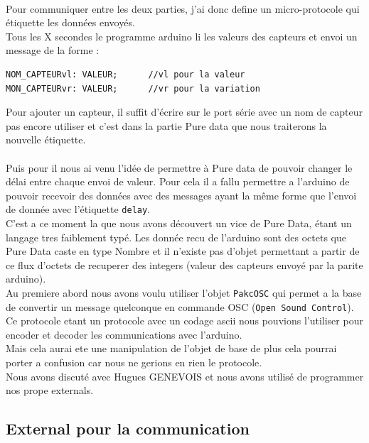 \documentclass[a4paper, titlepage, oneside, 12pt]{article}%
\begin{document}
\paragraph{}
Pour communiquer entre les deux parties, j'ai donc define un micro-protocole qui étiquette les données envoyés.\\
Tous les X secondes le programme arduino li les valeurs des capteurs et envoi un message de la forme :
\begin{lstlisting}
NOM_CAPTEURvl: VALEUR;		//vl pour la valeur
MON_CAPTEURvr: VALEUR;		//vr pour la variation
\end{lstlisting}

Pour ajouter un capteur, il suffit d'écrire sur le port série avec un nom de capteur pas encore utiliser et c'est dans la partie Pure data que nous traiterons la nouvelle étiquette.

\paragraph{}
Puis pour il nous ai venu l'idée de permettre à Pure data de pouvoir changer le délai entre chaque envoi de valeur. 
Pour cela il a fallu permettre a l'arduino de pouvoir recevoir des données avec des messages ayant la même forme que l'envoi de donnée avec l'étiquette \texttt{delay}.\\
C'est a ce moment la que nous avons découvert un vice de Pure Data, étant un langage tres faiblement typé. Les donnée recu de l'arduino sont des octets que Pure Data caste en type Nombre et il n'existe pas d'objet permettant a partir de ce flux d'octets de recuperer des integers (valeur des capteurs envoyé par la parite arduino).\\

Au premiere abord nous avons voulu utiliser l'objet \texttt{PakcOSC} qui permet a la base de convertir un message quelconque en commande OSC (\texttt{Open Sound Control}). Ce protocole etant un protocole avec un codage ascii nous pouvions l'utiliser pour encoder et decoder les communications avec l'arduino. \\
Mais cela aurai ete une manipulation de l'objet de base de plus cela pourrai porter a confusion car nous ne gerions en rien le protocole.\\
Nous avons discuté avec Hugues GENEVOIS et nous avons utilisé de programmer nos prope externals.

\subsection{External pour la communication}
\end{document}
